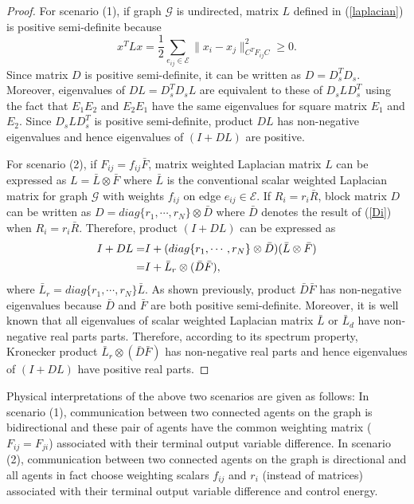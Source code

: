 \documentclass[12pt,draftcls,onecolumn]{IEEEtran}  %
\begin{document}
\begin{proof}
For scenario (1), if graph $\mathcal{G}$ is undirected, matrix $L$ defined in (\ref{laplacian}) is positive semi-definite because
\[x^TLx =\frac{1}{2}\sum_{e_{ij}\in\mathcal{E}}\|x_i-x_j\|^2_{C^TF_{ij}C}\geq 0.\]
Since matrix $D$ is positive semi-definite, it can be written as $D=D^T_sD_s$. Moreover, eigenvalues of $DL=D_s^TD_sL$ are equivalent to these of $D_sLD_s^T$ using the fact that $E_1E_2$ and $E_2E_1$ have the same eigenvalues for square matrix $E_1$ and $E_2$. Since $D_sLD_s^T$ is positive semi-definite, product $DL$ has non-negative eigenvalues and hence eigenvalues of $(I+DL)$ are positive. 

For scenario (2), if $F_{ij}=f_{ij}\bar{F}$, matrix weighted Laplacian matrix $L$ can be expressed as $L=\bar{L}\otimes \bar{F}$ where $\bar{L}$ is the conventional scalar weighted Laplacian matrix for graph $\mathcal{G}$ with weights $f_{ij}$ on edge $e_{ij}\in\mathcal{E}$. If $R_i=r_i\bar{R}$, block matrix $D$ can be written as $D=diag\{r_1,\cdots,r_N\}\otimes \bar{D}$ where $\bar{D}$ denotes the result of (\ref{Di}) when $R_i=r_i\bar{R}$. Therefore, product $(I+DL)$ can be expressed as
\begin{align}
I+DL=&I+(diag\{r_1,\cdots,r_N\}\otimes \bar{D})(\bar{L}\otimes \bar{F})\notag\\
=&I+\bar{L}_r\otimes(\bar{D}\bar{F})\notag,
\end{align}
where $\bar{L}_r=diag\{r_1,\cdots,r_N\}\bar{L}$. As shown previously, product $\bar{D}\bar{F}$ has non-negative eigenvalues because $\bar{D}$ and $\bar{F}$ are both positive semi-definite. Moreover, it is well known that all eigenvalues of scalar weighted Laplacian matrix $\bar{L}$ or $\bar{L}_d$ have non-negative real parts parts. Therefore, according to its spectrum property, Kronecker product $\bar{L}_r\otimes(\bar{D}\bar{F})$ has non-negative real parts and hence eigenvalues of $(I+DL)$ have positive real parts.
\end{proof}

Physical interpretations of the above two scenarios are given as follows: In scenario (1), communication between two connected agents on the graph is bidirectional and these pair of agents have the common weighting matrix ($F_{ij}=F_{ji}$) associated with their terminal output variable difference. In scenario (2), communication between two connected agents on the graph is directional and all agents in fact choose weighting scalars $f_{ij}$ and $r_i$ (instead of matrices) associated with their terminal output variable difference and control energy. 
\end{document}
